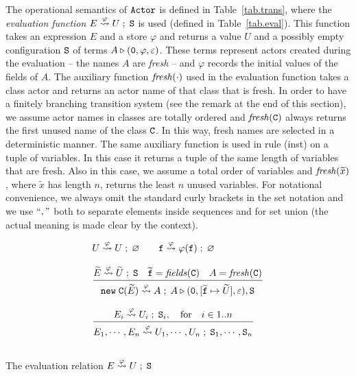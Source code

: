 \documentclass{LMCS}
\theoremstyle{plain}\newtheorem{proposition}[thm]{Proposition}
\theoremstyle{plain}\newtheorem{lemma}[thm]{Lemma}
\theoremstyle{plain}\newtheorem{theorem}[thm]{Theorem}
\theoremstyle{plain}\newtheorem{corollary}[thm]{Corollary}
\newcommand{\bigfract}[2]{\frac{^{\textstyle #1}}{_{\textstyle #2}}}
\newcommand{\rulename}[1]{{\sc(#1)}}
\newcommand{\pinull}{{\tt 0}}
\newcommand{\newact}[1]{{\tt new} \; #1}
\newcommand{\State}{{\tt S}}
\newcommand{\lleadsto}[1]{\stackrel{#1}{\leadsto}}
\newcommand{\f}{{\tt f}}
\newcommand{\fresh}[1]{{\it fresh}(#1)}
\newcommand{\fields}[1]{{\it fields}(#1)}
\newcommand{\wt}[1]{\widetilde{#1}}
\newcommand{\adef}[1]{{\tt #1}}
\newcommand{\actor}{${\tt Actor}$}
\begin{document}
The operational semantics of {\actor} is defined in 
Table~\ref{tab.trans}, where the \emph{evaluation function} 
$E \lleadsto{\varphi} U \; ; \; \State$ is used (defined in Table~\ref{tab.eval}). This function 
takes an expression $E$ and a
store $\varphi$ and returns a value $U$ and a possibly empty configuration $\State$
of terms $A \triangleright (\pinull, \varphi, \varepsilon)$. These 
terms represent actors  created during the evaluation -- the names $A$ are \emph{fresh} --
and $\varphi$ records the initial values of the fields of $A$.
The auxiliary function $\fresh{\cdot}$ used in the evaluation function
takes a class actor and returns an actor name of that class that is fresh.
In order to have a finitely branching transition system (see the remark
at the end of this section), we assume actor names 
in classes are totally ordered and $\fresh{\adef{C}}$ always
returns the first unused name of the class $\adef{C}$. In this way,
fresh names are selected in a deterministic manner.  
The same auxiliary function is used in rule \rulename{inst} 
 on a tuple of variables. In this case it returns a 
tuple of the same length of variables that are fresh. Also in this case, we
assume a total order of variables and $\fresh{\wt{x}}$, where $\wt{x}$ has length $n$, returns the least $n$ unused variables.  
For notational convenience, we  always
omit the standard curly brackets in the set notation
and we use $``,"$ both to separate elements inside 
sequences and for set union (the actual meaning is made
clear by the context).
\begin{table} 
\[
\begin{array}{l}
U \lleadsto{\varphi} U \; ; \; \varnothing
\qquad \f \lleadsto{\varphi} \varphi(\f) \; ; \; \varnothing
\\
\\
\bigfract{ \wt{E} \lleadsto{\varphi} \wt{U}\; ; \; \State 
	\quad \wt{\f} = \fields{\adef{C}}
	\quad A = \fresh{\adef{C}}
	}{\newact{\adef{C}}(\wt{E}) \lleadsto{\varphi} A\; ; \; A \triangleright (\pinull, 
	[\wt{\f} \mapsto \wt{U}], \varepsilon), \State
	}
\\
\\
\bigfract{ E_i \lleadsto{\varphi} U_i \; ; \; \State_i, \quad \mbox{\rm for} \quad {i \in 1..n}
	}{
	E_1, \cdots , E_n \lleadsto{\varphi} U_1, \cdots , U_n \; ; \; \State_1, 
	\cdots , \State_n
	}
\\
\\
\end{array}
\]
\caption{\label{tab.eval} The evaluation relation $E \lleadsto{\varphi} U \; ; \; \State$}
\end{table}
\end{document}
